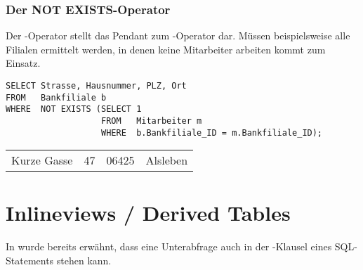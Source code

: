         \subsubsection{Der NOT EXISTS-Operator}
          Der -Operator stellt das Pendant zum -Operator dar. Müssen beispielsweise alle Filialen ermittelt werden, in denen keine Mitarbeiter arbeiten kommt  zum Einsatz.
          \begin{lstlisting}[language=oracle_sql,caption={Der \languageorasql{NOT EXISTS}-Operator},label=sql06_09]
SELECT Strasse, Hausnummer, PLZ, Ort
FROM   Bankfiliale b
WHERE  NOT EXISTS (SELECT 1
                   FROM   Mitarbeiter m
                   WHERE  b.Bankfiliale_ID = m.Bankfiliale_ID);
          \end{lstlisting}
          \begin{center}
            \begin{small}
              \tablehead{}

              \begin{msoraclesql}
                \begin{supertabular}{llll}
                  Kurze Gasse & 47 & 06425 & Alsleben \\
                \end{supertabular}
              \end{msoraclesql}
            \end{small}
          \end{center}
    \section{Inlineviews / Derived Tables}
      In  wurde bereits erwähnt, dass eine Unterabfrage auch in der \FROM-Klausel eines SQL-Statements stehen kann.

